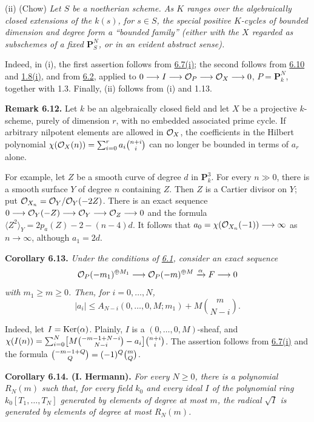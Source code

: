 (ii) (Chow) \emph{Let $S$ be a noetherian scheme. As $K$ ranges over
the algebraically closed extensions of the $k(s)$, for $s\in S$, the
special positive $K$-cycles of bounded dimension and degree form a
``bounded family'' (either with the $X$ regarded as subschemes of a fixed
$\mathbf P^N_S$, or in an evident abstract sense).}

Indeed, in (i), the first assertion follows from \hyperlink{sga6.e13.thm.6-7}{6.7(i)}; the second
follows from \hyperlink{sga6.e13.lem.6-10}{6.10} and \hyperlink{sga6.e13.prop.1-8}{1.8(i)}, and from \hyperlink{sga6.e13.lem.6-2}{6.2}, applied to
$0\longrightarrow I\longrightarrow\mathcal O_P\longrightarrow\mathcal O_X\longrightarrow0$,
$P=\mathbf P^N_k$, together with 1.3. Finally, (ii) follows from (i) and
1.13.

\textbf{Remark 6.12.} Let $k$ be an algebraically closed field and let
$X$ be a projective $k$-scheme, purely of dimension $r$, with no embedded
associated prime cycle. If arbitrary nilpotent elements are allowed in
$\mathcal O_X$, the coefficients in the Hilbert polynomial
$\chi(\mathcal O_X(n))=\sum_{i=0}^{r}a_i\binom{n+i}{i}$ can no longer be bounded
in terms of $a_r$ alone.

For example, let $Z$ be a smooth curve of degree $d$ in $\mathbf P^3_k$.
For every $n\gg0$, there is a smooth surface $Y$ of degree $n$ containing
$Z$. Then $Z$ is a Cartier divisor on $Y$; put
$\mathcal O_{X_n}=\mathcal O_Y/\mathcal O_Y(-2Z)$. There is an exact sequence
$0\longrightarrow\mathcal O_Y(-Z)\longrightarrow
\mathcal O_Y\longrightarrow\mathcal O_Z\longrightarrow0$ and the formula
$\langle Z^2\rangle_Y=2p_a(Z)-2-(n-4)d$. It follows that
$a_0=\chi(\mathcal O_{X_n}(-1))\longrightarrow\infty$ as $n\longrightarrow
\infty$, although $a_1=2d$.

\textbf{Corollary 6.13.} \emph{Under the conditions of \hyperlink{sga6.e13.para.6-1}{6.1}, consider an exact sequence
\[
  \mathcal O_P(-m_1)^{\oplus M_1}\longrightarrow
  \mathcal O_P(-m)^{\oplus M}\xrightarrow{\alpha}F\longrightarrow0
\]
with $m_1\geq m\geq0$. Then, for $i=0,\ldots,N$,
\[
  |a_i|\leq A_{N-i}(0,\ldots,0,M;m_1)
  +M\binom{m}{N-i}.
\]}

Indeed, let $I=\operatorname{Ker}(\alpha)$. Plainly, $I$ is a
$(0,\ldots,0,M)$-sheaf, and
$\chi(I(n))=\allowbreak\sum_{i=0}^{N}
\bigl[M\tbinom{-m-1+N-i}{N-i}-a_i\bigr]\allowbreak\tbinom{n+i}{i}$.
The assertion follows from \hyperlink{sga6.e13.thm.6-7}{6.7(i)} and the formula
$\tbinom{-m-1+Q}{Q}=(-1)^Q\tbinom{m}{Q}$.

\textbf{Corollary 6.14. (I. Hermann).} \emph{For every $N\geq0$, there
is a polynomial $R_N(m)$ such that, for every field $k_0$ and every ideal
$I$ of the polynomial ring $k_0[T_1,\ldots,T_N]$ generated by elements
of degree at most $m$, the radical $\sqrt I$ is generated by elements of
degree at most $R_N(m)$.}

